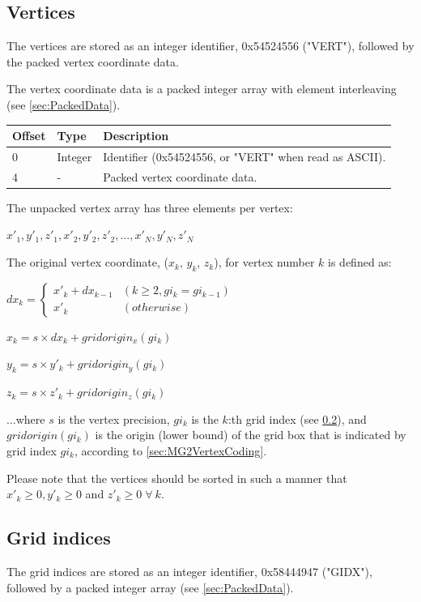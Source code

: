 \subsection{Vertices}
The vertices are stored as an integer identifier, 0x54524556 ("VERT"), followed
by the packed vertex coordinate data.

The vertex coordinate data is a packed integer array with element interleaving
(see \ref{sec:PackedData}).

\begin{tabular}{|l|l|l|}\hline
\textbf{Offset} &  \textbf{Type} & \textbf{Description}\\ \hline
0 & Integer & Identifier (0x54524556, or "VERT" when read as ASCII).\\ \hline
4 & - & Packed vertex coordinate data.\\ \hline
\end{tabular}

The unpacked vertex array has three elements per vertex:

$x'_1, y'_1, z'_1, x'_2, y'_2, z'_2, ..., x'_N, y'_N, z'_N$

The original vertex coordinate, ($x_k$, $y_k$, $z_k$), for vertex number $k$ is defined as:

$dx_k = \begin{cases}
x'_k + dx_{k-1} & (k \geq 2, gi_k = gi_{k-1})\\
x'_k & (otherwise)
\end{cases}$

$x_k = s \times dx_k + gridorigin_x(gi_k)$

$y_k = s \times y'_k + gridorigin_y(gi_k)$

$z_k = s \times z'_k + gridorigin_z(gi_k)$

...where $s$ is the vertex precision, $gi_k$ is the $k$:th grid index (see \ref{sec:GridIndices}),
and $gridorigin(gi_k)$ is the origin (lower bound) of the grid box that is indicated by
grid index $gi_k$, according to \ref{sec:MG2VertexCoding}.

Please note that the vertices should be sorted in such a manner that $x'_k \geq 0, y'_k \geq 0$
and $z'_k \geq 0 \; \forall \: k$.


\subsection{Grid indices}
\label{sec:GridIndices}
The grid indices are stored as an integer identifier, 0x58444947 ("GIDX"), followed
by a packed integer array (see \ref{sec:PackedData}).

